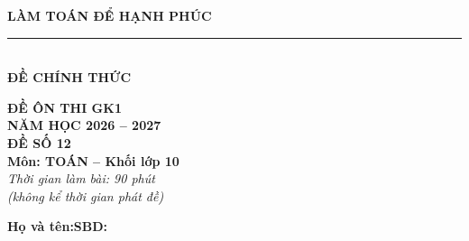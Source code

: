 \documentclass[12pt,a4paper]{article}
\begin{document}
\noindent
\begin{minipage}[c]{0.38\textwidth}
    \centering
    \textbf{LÀM TOÁN ĐỂ HẠNH PHÚC}\\[-2pt]
    \rule{3.2cm}{0.6pt}\\[4pt]
    \textbf{ĐỀ CHÍNH THỨC}
\end{minipage}\hfill
\begin{minipage}[c]{0.35\textwidth}
    \centering
    \textbf{ĐỀ ÔN THI GK1}\\
    \textbf{NĂM HỌC 2026 -- 2027}\\[2pt]
    \textbf{ĐỀ SỐ 12}\\
    \textbf{Môn: TOÁN -- Khối lớp 10}\\
    \textit{\small Thời gian làm bài: 90 phút\\(không kể thời gian phát đề)}
\end{minipage}

\vspace{0.2cm}
\noindent
\begin{minipage}[b]{0.78\textwidth}
    \textbf{Họ và tên:}\dotfill\textbf{SBD:}\makebox[3.5cm]{\dotfill}
\end{minipage}\hfill
\begin{minipage}[b]{0.20\textwidth}
    \hfill
    \setlength{\fboxrule}{0.8pt}%
\end{minipage}
\vspace{0.2cm}
\end{document}

